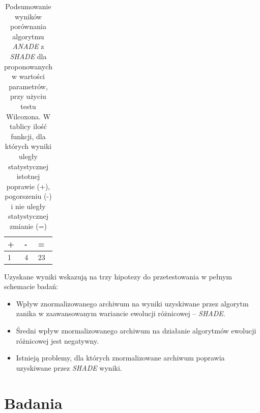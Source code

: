 \documentclass[12pt,a4paper]{report}
\begin{document}
{{{{{{\begin{table}[h]
\centering
\caption{Podsumowanie wyników porównania algorytmu \emph{ANADE} z \emph{SHADE} dla proponowanych w \cite{SHADE} wartości parametrów, przy użyciu testu Wilcoxona. W tablicy ilość funkcji, dla których wyniki uległy statystycznej istotnej poprawie (+), pogorszeniu (-) i nie uległy statystycznej zmianie (=)}
\label{Eksp3short}
\begin{tabular}{|l|l|l|}
\hline
{\bf +} & {\bf -} & {\bf =} \\ \hline
1       & 4       & 23      \\ \hline
\end{tabular}
\end{table}

\par{
Uzyskane wyniki wskazują na trzy hipotezy do przetestowania w pełnym schemacie badań:
\begin{itemize}
\item Wpływ znormalizowanego archiwum na wyniki uzyskiwane przez algorytm zanika w zaawansowanym wariancie ewolucji różnicowej -- \emph{SHADE}.
\item Średni wpływ znormalizowanego archiwum na działanie algorytmów ewolucji różnicowej jest negatywny.
\item Istnieją problemy, dla których znormalizowane archiwum poprawia uzyskiwane przez \emph{SHADE} wyniki.
\end{itemize}
}

\chapter{Badania}
\label{badania}
}}}}}}
\end{document}
